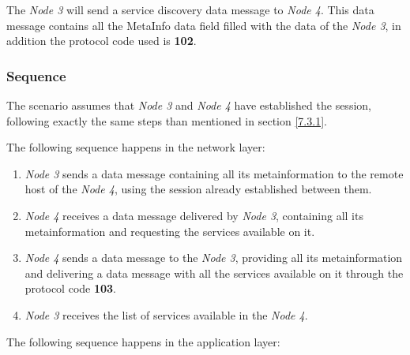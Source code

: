 The \emph{Node 3} will send a service discovery data message to \emph{Node 4}. This data message contains all the MetaInfo data field filled with the data of the \emph{Node 3}, in addition the protocol code used is \textbf{102}.

\subsubsection{Sequence}

The scenario assumes that \emph{Node 3} and \emph{Node 4} have established the session, following exactly the same steps than mentioned in section \ref{7.3.1}.

The following sequence happens in the network layer:

\begin{enumerate}

\item \emph{Node 3} sends a data message  containing all its metainformation to the remote host of the \emph {Node 4}, using the session already established between them.

\item \emph{Node 4} receives a data message delivered by \emph{Node 3}, containing all its metainformation and requesting the services available on it.

\item \emph{Node 4} sends a data message to the \emph{Node 3}, providing all its metainformation and delivering a data message with all the services available on it through the protocol code \textbf{103}.

\item \emph{Node 3} receives the list of services available in the \emph{Node 4}.

\end{enumerate}

The following sequence happens in the application layer:

